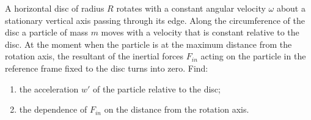 \item A horizontal disc of radius \( R \) rotates with a constant angular velocity \( \omega \) about a stationary vertical axis passing through its edge. Along the circumference of the disc a particle of mass \( m \) moves with a velocity that is constant relative to the disc. At the moment when the particle is at the maximum distance from the rotation axis, the resultant of the inertial forces \( F_{in} \) acting on the particle in the reference frame fixed to the disc turns into zero. Find:
    \begin{enumerate}
        \item the acceleration \( w' \) of the particle relative to the disc;
        \item the dependence of \( F_{in} \) on the distance from the rotation axis.
    \end{enumerate}
